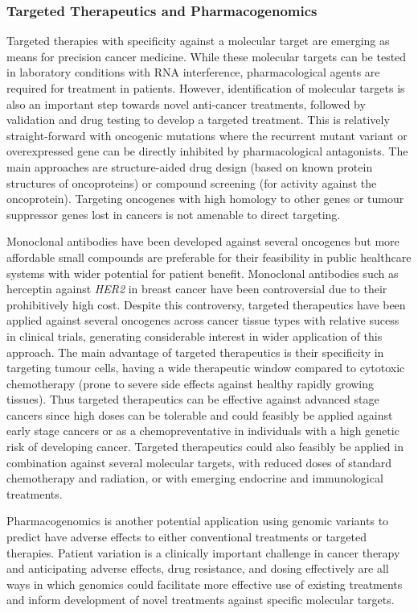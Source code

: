 \subsubsection{Targeted Therapeutics and Pharmacogenomics}
Targeted therapies with specificity against a molecular target are emerging as means for precision cancer medicine. While these molecular targets can be tested in laboratory conditions with RNA interference, pharmacological agents are required for treatment in patients. However, identification of molecular targets is also an important step towards novel anti-cancer treatments, followed by validation and drug testing to develop a targeted treatment. This is relatively straight-forward with oncogenic mutations where the recurrent mutant variant or overexpressed gene can be directly inhibited by pharmacological antagonists. The main approaches are structure-aided drug design (based on known protein structures of oncoproteins) or compound screening (for activity against the oncoprotein). Targeting oncogenes with high homology to other genes or tumour suppressor genes lost in cancers is not amenable to direct targeting.

Monoclonal antibodies have been developed against several oncogenes but more affordable small compounds are preferable for their feasibility in public healthcare systems with wider potential for patient benefit. Monoclonal antibodies such as herceptin against \textit{HER2} in breast cancer have been controversial due to their prohibitively high cost. Despite this controversy, targeted therapeutics have been applied against several oncogenes across cancer tissue types with relative sucess in clinical trials, generating considerable interest in wider application of this approach. The main advantage of targeted therapeutics is their specificity in targeting tumour cells, having a wide therapeutic window compared to cytotoxic chemotherapy (prone to severe side effects against healthy rapidly growing tissues). Thus targeted therapeutics can be effective against advanced stage cancers since high doses can be tolerable and could feasibly be applied against early stage cancers or as a chemopreventative in individuals with a high genetic risk of developing cancer. Targeted therapeutics could also feasibly be applied in combination against several molecular targets, with reduced doses of standard chemotherapy and radiation, or with emerging endocrine and immunological treatments.

Pharmacogenomics is another potential application using genomic variants to predict have adverse effects to either conventional treatments or targeted therapies. Patient variation is a clinically important challenge in cancer therapy and anticipating adverse effects, drug resistance, and dosing effectively are all ways in which genomics could facilitate more effective use of existing treatments and inform development of novel treatments against specific molecular targets.

